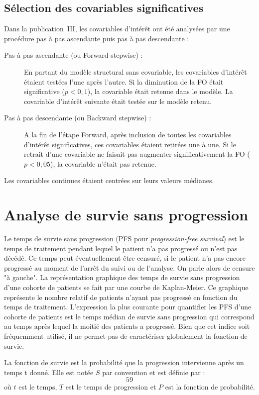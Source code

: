 \subsection{Sélection des covariables significatives}
Dans la publication~III, les covariables d'intérêt ont été analysées par une procédure pas à pas ascendante puis pas à pas descendante :
\begin{description}
\item[Pas à pas ascendante (ou Forward stepwise) :] En partant du modèle structural sans covariable, les covariables d'intérêt étaient testées l'une après l'autre. Si la diminution de la FO était significative ($p < 0,1$), la covariable était retenue dans le modèle. La covariable d'intérêt suivante était testée sur le modèle retenu.
\item[Pas à pas descendante (ou Backward stepwise) :] A la fin de l'étape Forward, après inclusion de toutes les covariables d'intérêt significatives, ces covariables étaient retirées une à une. Si le retrait d'une covariable ne faisait pas augmenter significativement la FO ($p < 0,05$), la covariable n'était pas retenue.
\end{description}
Les covariables continues étaient centrées sur leurs valeurs médianes. 
\section{Analyse de survie sans progression}
Le temps de survie sans progression (PFS pour \textit{progression-free survival}) est le temps de traitement pendant lequel le patient n'a pas progressé ou n'est pas décédé. Ce temps peut éventuellement être censuré, si le patient n'a pas encore progressé au moment de l'arrêt du suivi ou de l'analyse. On parle alors de censure "à gauche". La représentation graphique des temps de survie sans progression d'une cohorte de patients se fait par une courbe de Kaplan-Meier. Ce graphique représente le nombre relatif de patients n'ayant pas progressé en fonction du temps de traitement. L'expression la plus courante pour quantifier les PFS d'une cohorte de patients est le temps médian de survie sans progression qui correspond au temps après lequel la moitié des patients a progressé. Bien que cet indice soit fréquemment utilisé, il ne permet pas de caractériser globalement la fonction de survie.

La fonction de survie est la probabilité que la progression intervienne après un temps t donné. Elle est notée $S$ par convention et est définie par :
\begin{equation}
59
\end{equation}
où $t$ est le temps, $T$ est le temps de progression et $P$ est la fonction de probabilité.

